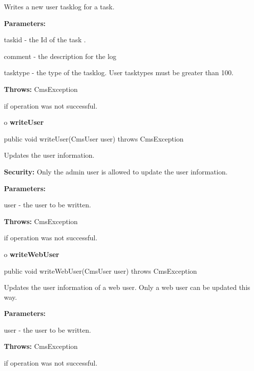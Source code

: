 \begin{description}
\htmlDD Writes a new user tasklog for a task.

\begin{description}
\item {\bf Parameters:}

taskid - the Id of the task .

comment - the description for the log

tasktype - the type of the tasklog. User tasktypes must be greater than 100.
\item {\bf Throws:} CmsException

if operation was not successful.
\end{description}

\end{description}

o {\bf writeUser}

\begin{PRE}
 public void writeUser(CmsUser user) throws CmsException
\end{PRE}

\begin{description}
\htmlDD Updates the user information.

{\bf Security:} Only the admin user is allowed to update the user information.


\begin{description}
\item {\bf Parameters:}

user - the user to be written.
\item {\bf Throws:} CmsException

if operation was not successful.
\end{description}

\end{description}

o {\bf writeWebUser}

\begin{PRE}
 public void writeWebUser(CmsUser user) throws CmsException
\end{PRE}

\begin{description}
\htmlDD Updates the user information of a web user. \htmlBR
Only a web user can be updated this way.

\begin{description}
\item {\bf Parameters:}

user - the user to be written.
\item {\bf Throws:} CmsException

if operation was not successful.
\end{description}

\end{description}

